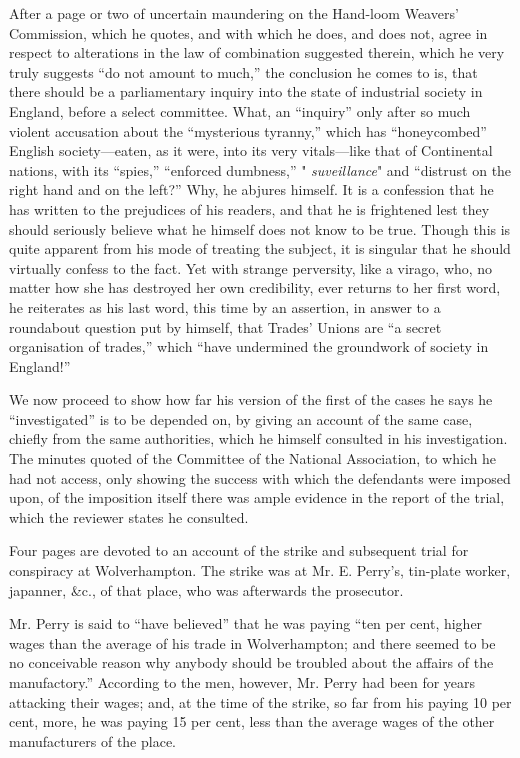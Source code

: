 After a page or two of uncertain maundering on the Hand-loom Weavers'
Commission, which he quotes, and with which he does, and does not, agree
in respect to alterations in the law of combination suggested therein,
which he very truly suggests ``do not amount to much,'' the conclusion
he comes to is, that there should be a parliamentary inquiry into the
state of industrial society in England, before a select committee. What,
an ``inquiry'' only after so much violent accusation about the
``mysterious tyranny,'' which has ``honeycombed'' English
society---eaten, as it were, into its very vitals---like that of
Continental nations, with its ``spies,'' ``enforced dumbness,'' "
\textit{suveillance}" and ``distrust on the right hand and on the
left?'' Why, he abjures himself. It is a confession that he has written
to the prejudices of his readers, and that he is frightened lest they
should seriously believe what he himself does not know to be true.
Though this is quite apparent from his mode of treating the subject, it
is singular that he should virtually confess to the fact. Yet with
strange perversity, like a virago, who, no matter how she has destroyed
her own credibility, ever returns to her first word, he reiterates as
his last word, this time by an assertion, in answer to a roundabout
question put by himself, that Trades' Unions are ``a secret organisation
of trades,'' which ``have undermined the groundwork of society in
England!''

We now proceed to show how far his version of the first of the cases he
says he ``investigated'' is to be depended on, by giving an account of
the same case, chiefly from the same authorities, which he himself
consulted in his investigation. The minutes quoted of the Committee of
the National Association, to which he had not access, only showing the
success with which the defendants were imposed upon, of the imposition
itself there was ample evidence in the report of the trial, which the
reviewer states he consulted.

Four pages are devoted to an account of the strike and subsequent trial
for conspiracy at Wolverhampton. The strike was at Mr. E. Perry's,
tin-plate worker, japanner, \&c., of that place, who was afterwards the
prosecutor.

Mr. Perry is said to ``have believed'' that he was paying ``ten per
cent, higher wages than the average of his trade in Wolverhampton; and
there seemed to be no conceivable reason why anybody should be troubled
about the affairs of the manufactory.'' According to the men, however,
Mr. Perry had been for years attacking their wages; and, at the time of
the strike, so far from his paying 10 per cent, more, he was paying 15
per cent, less than the average wages of the other manufacturers of the
place.

